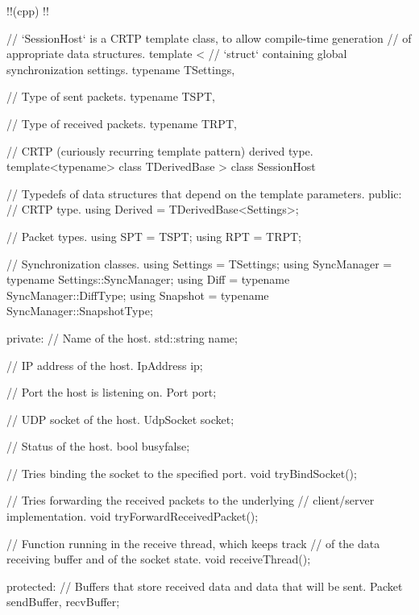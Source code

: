 \documentclass{report}
\begin{document}
!!(cpp)
!!{
    // `SessionHost` is a CRTP template class, to allow compile-time generation 
    // of appropriate data structures.
    template
    <
        // `struct` containing global synchronization settings.
        typename TSettings, 
        
        // Type of sent packets.
        typename TSPT, 
        
        // Type of received packets.
        typename TRPT, 

        // CRTP (curiously recurring template pattern) derived type.
        template<typename> class TDerivedBase
    > 
    class SessionHost
    {
        // Typedefs of data structures that depend on the template parameters.
        public:
            // CRTP type.
            using Derived = TDerivedBase<Settings>;

            // Packet types.
            using SPT = TSPT;
            using RPT = TRPT;
        
            // Synchronization classes.
            using Settings = TSettings;
            using SyncManager = typename Settings::SyncManager;
            using Diff = typename SyncManager::DiffType;
            using Snapshot = typename SyncManager::SnapshotType;

        private:
            // Name of the host.
            std::string name;
            
            // IP address of the host.
            IpAddress ip;

            // Port the host is listening on.
            Port port;

            // UDP socket of the host.
            UdpSocket socket;

            // Status of the host.
            bool busy{false};

            // Tries binding the socket to the specified port.
            void tryBindSocket();    

            // Tries forwarding the received packets to the underlying 
            // client/server implementation.
            void tryForwardReceivedPacket();
            
            // Function running in the receive thread, which keeps track
            // of the data receiving buffer and of the socket state.
            void receiveThread();

        protected:
            // Buffers that store received data and data that will be sent.
            Packet sendBuffer, recvBuffer;

}}
\end{document}
